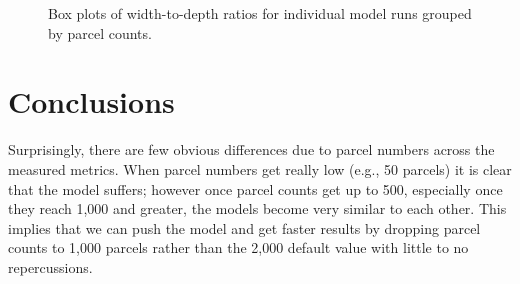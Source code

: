\begin{figure}[!ht]
	\caption{Box plots of width-to-depth ratios for individual model runs grouped by parcel counts.}
	\label{fig:np_wd_box}
\end{figure}

\section{Conclusions}
Surprisingly, there are few obvious differences due to parcel numbers across the measured metrics.
When parcel numbers get really low (e.g., 50 parcels) it is clear that the model suffers; however once parcel counts get up to 500, especially once they reach 1,000 and greater, the models become very similar to each other.
This implies that we can push the model and get faster results by dropping parcel counts to 1,000 parcels rather than the 2,000 default value with little to no repercussions.

\clearpage

